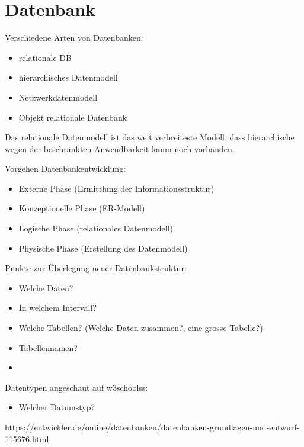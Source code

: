 \section{Datenbank}

Verschiedene Arten von Datenbanken:
\begin{itemize}
\item relationale DB
\item hierarchisches Datenmodell
\item Netzwerkdatenmodell
\item Objekt relationale Datenbank
\end{itemize}

Das relationale Datenmodell ist das weit verbreiteste Modell, dass hierarchische wegen der beschränkten Anwendbarkeit kaum noch vorhanden.

Vorgehen Datenbankentwicklung:

\begin{itemize}
\item Externe Phase (Ermittlung der Informationsstruktur)
\item Konzeptionelle Phase (ER-Modell)
\item Logische Phase (relationales Datenmodell)
\item Physische Phase (Erstellung des Datenmodell)
\end{itemize}

Punkte zur Überlegung neuer Datenbankstruktur:
\begin{itemize}
\item Welche Daten?
\item In welchem Intervall?
\item Welche Tabellen? (Welche Daten zusammen?, eine grosse Tabelle?)
\item Tabellennamen?
\item 
\end{itemize}

Datentypen angeschaut auf w3schoolss:
\begin{itemize}
\item Welcher Datumstyp?

\end{itemize}

https://entwickler.de/online/datenbanken/datenbanken-grundlagen-und-entwurf-115676.html
